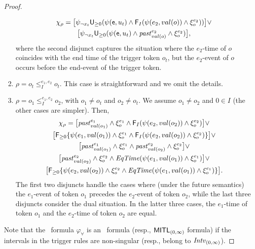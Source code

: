 \begin{proof}
\begin{enumerate}
  \begin{multline*}
  \chi_\rho = \big[\psi_{\neg x_t}\textsf{U}_{\geq 0}(\psi(\mathsf{e},u_t)\wedge \textsf{F}_I (\psi(e_2, val(o))\wedge \xi_o^{e_2}) ) \big]\vee\\
  \big[\psi_{\neg x_t}\textsf{U}_{\geq 0}(\psi(\mathsf{e},u_t)\wedge {\mathit{past}}_{val(o)}^{e_2} \wedge \xi_o^{e_2})\big],
  \end{multline*}
  where the second disjunct captures the situation where the $e_2$-time  of $o$ coincides with the end time of the trigger token $o_t$, but the $e_2$-event of $o$ occurs before the end-event of the trigger token.
  \item $\rho = o_t \leq_I^{e_1,e_2} o_t$. This case is straightforward and we omit the details.
  \item $\rho = o_1 \leq_I^{e_1,e_2} o_2$, with $o_1\neq o_t$ and $o_2 \neq o_t$. We assume $o_1\neq o_2$  and $0\in I$ (the other cases are simpler).  Then,
\begin{multline*}
  \chi_\rho =  \big[{\mathit{past}}_{val(o_1)}^{e_1} \wedge \xi_o^{e_1} \wedge \textsf{F}_I (\psi(e_2,val(o_2)) \wedge \xi_o^{e_2}) \big]   \vee \\    \big[\textsf{F}_{\geq 0}\{\psi(e_1,val(o_1)) \wedge \xi_o^{e_1} \wedge \textsf{F}_I (\psi(e_2,val(o_2)) \wedge \xi_o^{e_2})\} \big]   \vee \\
    \big[{\mathit{past}}_{val(o_1)}^{e_1} \wedge \xi_o^{e_1} \wedge {\mathit{past}}_{val(o_2)}^{e_2} \wedge \xi_o^{e_2}\big] \vee \\
    \big[{\mathit{past}}_{val(o_2)}^{e_2} \wedge \xi_o^{e_2} \wedge {\mathit{EqTime}}(\psi(e_1,val(o_1)) \wedge\xi_o^{e_1})\big]   \vee \\
  \big[\textsf{F}_{\geq 0}\{\psi(e_2,val(o_2)) \wedge \xi_o^{e_2} \wedge {\mathit{EqTime}}(\psi(e_1,val(o_1)) \wedge\xi_o^{e_1})\}\big].
\end{multline*}
The first two disjuncts handle the cases where (under the future semantics) the $e_1$-event of token $o_1$ precedes the $e_2$-event of token $o_2$, while the last three disjuncts consider the dual situation.
In the latter three cases, the $e_1$-time of token $o_1$ and the $e_2$-time of token $o_2$ are equal.
\end{enumerate}
Note that the \MTL\ formula $\varphi_\forall$ is an \MITL\ formula (resp., $\text{\sffamily MITL}_{(0,\infty)}$ formula) if the intervals in the trigger rules are non-singular (resp., belong to ${\mathit{Intv}_{(0,\infty)}}$). 
 \end{proof}

